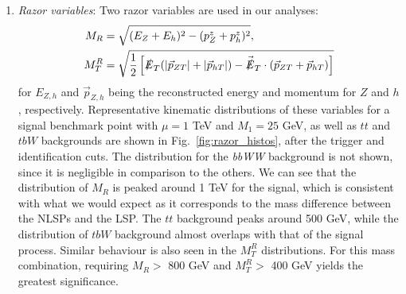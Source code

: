 \documentclass[a4paper,11pt]{article}
\begin{document}
\begin{enumerate}
  \item \emph{Razor variables}:  Two razor variables are used in our analyses: 
\begin{align}
M_R &= \sqrt{(E_Z+E_h)^2 - (p_Z^z + p_h^z)^2},\\
M_T^R &= \sqrt{\frac{1}{2}\left[\slashed{E}_T(|\vec{p}_{ZT}|+|\vec{p}_{hT}|)
- \vec{\slashed{E}}_T\cdot(\vec{p}_{ZT}+\vec{p}_{hT})\right]}
\end{align}
 for $E_{Z,h}$ and $\vec{p}_{Z,h}$ being the reconstructed energy and momentum for $Z$ and $h$, respectively.
      Representative kinematic
  distributions of these variables for a signal benchmark point with $\mu=1$ TeV and $M_1=25$ GeV, as well as $tt$ and $tbW$ backgrounds are
  shown in Fig.~\ref{fig:razor_histos}, after the trigger and identification cuts.
  The distribution for the \emph{bbWW} background is not shown, since it is negligible in
  comparison to the others.   We can see that the distribution of $M_R$ is peaked
  around 1 TeV for the signal, which is consistent with what we would expect as
  it corresponds to the mass difference between the NLSPs and the LSP.  The $tt$
  background peaks around 500 GeV, while the distribution of $tbW$ background
  almost overlaps with that of the signal process.
  Similar behaviour is also seen in the $M_T^R$ distributions.  
  For this mass combination, requiring $M_R >$ 800
  GeV and $M_T^R >$ 400 GeV yields the greatest significance.

\end{enumerate}
\end{document}
